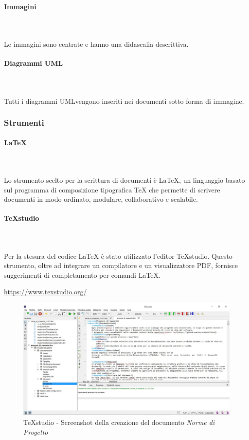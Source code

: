 		\paragraph{Immagini} \mbox{}\\ \mbox{}\\
		Le immagini sono centrate e hanno una didascalia descrittiva. 
		\paragraph{Diagrammi UML} \mbox{}\\ \mbox{}\\
		Tutti i diagrammi UML\glosp vengono inseriti nei documenti sotto forma di immagine.
	\subsubsection{Strumenti}
		\paragraph{\LaTeX} \mbox{}\\ \mbox{}\\
		Lo strumento scelto per la scrittura di documenti è \LaTeX{}, un linguaggio basato sul programma di composizione tipografica \TeX{} che permette di scrivere documenti in modo ordinato, modulare, collaborativo e scalabile.
		\paragraph{\TeX{}studio} \mbox{}\\ \mbox{}\\
		Per la stesura del codice \LaTeX{} è stato utilizzato l'editor \TeX{}studio. Questo strumento, oltre ad integrare un compilatore e un visualizzatore PDF, fornisce suggerimenti di completamento per comandi \LaTeX{}. \newline
		\centerline{\url{https://www.texstudio.org/}}
		\begin{figure}[H]
			\includegraphics[width=1\linewidth]{res/images/latex2.jpg}
			\caption{\TeX{}studio - Screenshot della creazione del documento \textit{Norme di Progetto}}
		\end{figure} 
